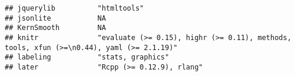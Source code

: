 \documentclass[
]{article}
\begin{document}
\begin{verbatim}
## jquerylib          "htmltools"                                                                                                                                                                                                                                                                                                                                                                                                                                  
## jsonlite           NA                                                                                                                                                                                                                                                                                                                                                                                                                                           
## KernSmooth         NA                                                                                                                                                                                                                                                                                                                                                                                                                                           
## knitr              "evaluate (>= 0.15), highr (>= 0.11), methods, tools, xfun (>=\n0.44), yaml (>= 2.1.19)"                                                                                                                                                                                                                                                                                                                                                     
## labeling           "stats, graphics"                                                                                                                                                                                                                                                                                                                                                                                                                            
## later              "Rcpp (>= 0.12.9), rlang"                                                                                                                                                                                                                                                                                                                                                                                                                    

\end{verbatim}
\end{document}
